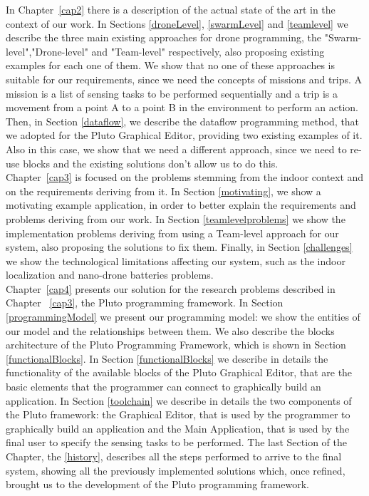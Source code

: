 In Chapter~\ref{cap2} there is a description of the actual state of the art in the context of our work.
In Sections \ref{droneLevel}, \ref{swarmLevel} and \ref{teamlevel} we describe the three main existing approaches for drone programming, the "Swarm-level","Drone-level" and "Team-level" respectively, also proposing existing examples for each one of them.
We show that no one of these approaches is suitable for our requirements, since we need the concepts of missions and trips.
A mission is a list of sensing tasks to be performed sequentially and a trip is a movement from a point A to a point B in the environment to perform an action.
Then, in Section \ref{dataflow}, we describe the dataflow programming method, that we adopted for the Pluto Graphical Editor, providing two existing examples of it.
Also in this case, we show that we need a different approach, since we need to re-use blocks and the existing solutions don't allow us to do this.
\\

Chapter~\ref{cap3} is focused on the problems stemming from the indoor context and on the requirements deriving from it.
In Section \ref{motivating}, we show a motivating example application, in order to better explain the requirements and problems deriving from our work.
In Section \ref{teamlevelproblems} we show the implementation problems deriving from using a Team-level approach for our system, also proposing the solutions to fix them.
Finally, in Section \ref{challenges} we show the technological limitations affecting our system, such as the indoor localization and nano-drone batteries problems.
\\

Chapter~\ref{cap4} presents our solution for the research problems described in Chapter ~\ref{cap3}, the Pluto programming framework.
In Section \ref{programmingModel} we present our programming model:
we show the entities of our model and the relationships between them.
We also describe the blocks architecture of the Pluto Programming Framework, which is shown in Section \ref{functionalBlocks}.
In Section \ref{functionalBlocks} we describe in details the functionality of the available blocks of the Pluto Graphical Editor, that are the basic elements that the programmer can connect to graphically build an application.
In Section \ref{toolchain} we describe in details the two components of the Pluto framework:
the Graphical Editor, that is used by the programmer to graphically build an application and the Main Application, that is used by the final user to specify the sensing tasks to be performed.
The last Section of the Chapter, the \ref{history}, describes all the steps performed to arrive to the final system, showing all the previously implemented solutions which, once refined, brought us to the development of the Pluto programming framework.
\\

